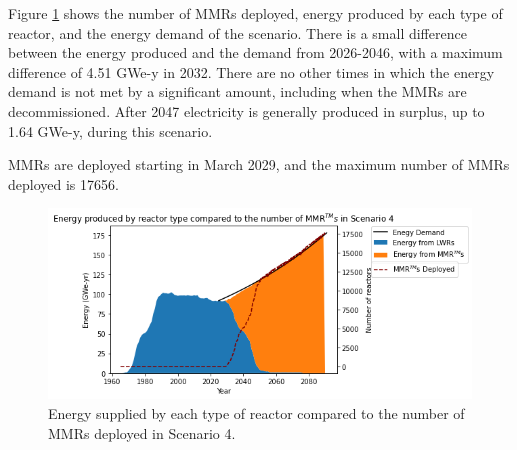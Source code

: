 Figure \ref{fig:energy_rx_4} shows the number of \glspl{MMR} deployed, 
energy produced by each type of reactor, and the energy demand of the 
scenario. There is a small difference between the energy produced and the 
demand from 2026-2046, with a maximum difference of 4.51 GWe-y in 2032.
There are no other times in which the energy demand is not met by a 
significant amount, including when the \glspl{MMR} are decommissioned. 
After 2047 electricity is generally produced in surplus, up to 1.64 GWe-y, during 
this scenario. 

\glspl{MMR} are deployed starting in March 2029, and the maximum number 
of \glspl{MMR} deployed is 17656. 

\begin{figure}
    \centering 
    \includegraphics[scale=0.5]{figures/energy_scenario4.png}
    \caption{Energy supplied by each type of reactor compared to the number of 
    \glspl{MMR} deployed in Scenario 4.}
    \label{fig:energy_rx_4}
\end{figure}



